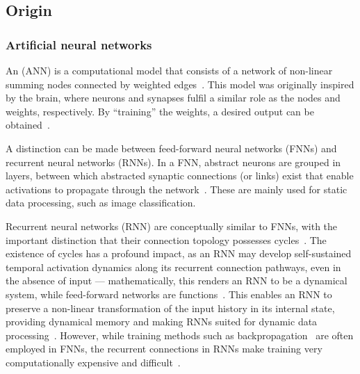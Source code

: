 \subsection{Origin}
\subsubsection{Artificial neural networks}
An  (ANN) is a computational model that consists of a network of non-linear summing nodes connected by weighted edges~\cite{EvaluatingRestrictedESNs}.
This model was originally inspired by the brain, where neurons and synapses fulfil a similar role as the nodes and weights, respectively.
By ``training'' the weights, a desired output can be obtained~\cite{EvaluatingRestrictedESNs}. \par

A distinction can be made between feed-forward neural networks (FNNs) and recurrent neural networks (RNNs).
In a FNN, abstract neurons are grouped in layers, between which abstracted synaptic connections (or links) exist that enable activations to propagate through the network~\cite{lukovsevivcius2009reservoir}.
These are mainly used for static data processing, such as image classification. \par

Recurrent neural networks (RNN) are conceptually similar to FNNs, with the important distinction that their connection topology possesses cycles~\cite{lukovsevivcius2009reservoir}.
The existence of cycles has a profound impact, as an RNN may develop self-sustained temporal activation dynamics along its recurrent connection pathways, even in the absence of input --- mathematically, this renders an RNN to be a dynamical system, while feed-forward networks are functions~\cite{lukovsevivcius2009reservoir}. %
This enables an RNN to preserve a non-linear transformation of the input history in its internal state, providing dynamical memory and making RNNs suited for dynamic data processing~\cite{lukovsevivcius2009reservoir,RC_RecentAdvances}.
However, while training methods such as backpropagation~\cite{Backpropagation} are often employed in FNNs, the recurrent connections in RNNs make training very computationally expensive and difficult~\cite{EvaluatingRestrictedESNs,Moon_2021,RC_SuperconductingElectronics}.



